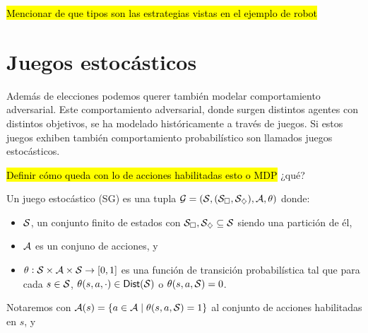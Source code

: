 \hl{Mencionar de que tipos son las estrategias vistas en el ejemplo de robot}







\section{Juegos estocásticos}

Además de elecciones podemos querer también modelar comportamiento adversarial.
Este comportamiento adversarial, donde surgen distintos agentes con distintos
objetivos, se ha modelado históricamente a través de juegos. Si estos juegos
exhiben también comportamiento probabilístico son llamados juegos estocásticos.

\hl{Definir cómo queda con lo de acciones habilitadas esto o MDP} ¿qué?
\begin{definition}
	Un juego estocástico (SG) es una tupla $\mathcal{G} = (\mathcal{S}, (\mathcal{S}_\square, \mathcal{S}_\diamondsuit), \mathcal{A}, \theta)$ donde:
	\begin{itemize}
		\item $\mathcal{S}$, un conjunto finito de estados con $\mathcal{S}_\square, \mathcal{S}_\diamondsuit \subseteq \mathcal{S}$ siendo una partición de él,
		\item $\mathcal{A}$ es un conjuno de acciones, y
		\item $\theta : \mathcal{S} \times \mathcal{A} \times \mathcal{S} \rightarrow [0,1]$ es una función de transición probabilística tal que para cada $s \in \mathcal{S}$, $\theta(s, a, \cdot) \in \mathsf{Dist}(\mathcal{S})$ o  $\theta(s, a, \mathcal{S}) = 0$.
	\end{itemize}
	Notaremos con $\mathcal{A}(s) = \{a \in \mathcal{A} \mid \theta(s,a,\mathcal{S}) = 1\}$ al conjunto de acciones habilitadas en $s$, y
\end{definition}

